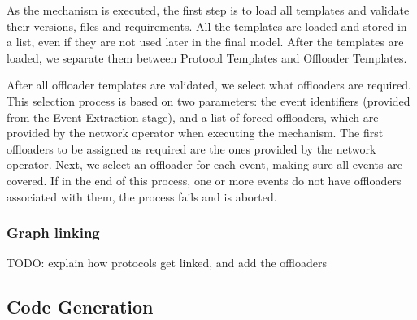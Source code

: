 
As the mechanism is executed, the first step is to load all templates and validate their versions, files and requirements. All the templates are loaded and stored in a list, even if they are not used later in the final model. After the templates are loaded, we separate them between Protocol Templates and Offloader Templates.

After all offloader templates are validated, we select what offloaders are required. This selection process is based on two parameters: the event identifiers (provided from the Event Extraction stage), and a list of forced offloaders, which are provided by the network operator when executing the mechanism. The first offloaders to be assigned as required are the ones provided by the network operator. Next, we select an offloader for each event, making sure all events are covered. If in the end of this process, one or more events do not have offloaders associated with them, the process fails and is aborted.

\subsubsection*{Graph linking}

TODO: explain how protocols get linked, and add the offloaders



\subsection{Code Generation}